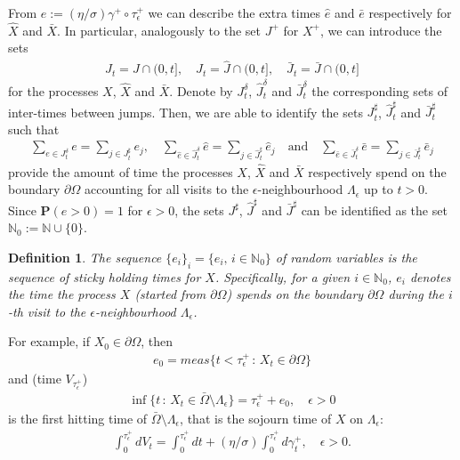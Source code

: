 \documentclass[11pt,a4paper]{article}
\newtheorem{definition}{Definition}
\newcommand{\magenta}{black}
\begin{document}
\noindent From $e:= (\eta/\sigma) \gamma^+ \circ \tau^+_\epsilon$ we can describe the extra times $\hat{e}$ and $\bar{e}$ respectively for $\hat{X}$ and $\bar{X}$. In particular, analogously to the set $J^+$ for $X^+$, we can introduce the sets
\begin{align*}
J_t = J \cap (0, t], \quad \hat{J}_t = \hat{J} \cap (0, t], \quad \bar{J}_t = \bar{J} \cap (0, t]
\end{align*}
for the processes $X$, $\hat{X}$ and $\bar{X}$. Denote by $J^\delta_t$, $\hat{J}^\delta_t$ and $\bar{J}^\delta_t$ the corresponding sets of inter-times between jumps. Then, we are able to identify the sets $J^\sharp_t$, $\hat{J}^\sharp_t$ and $\bar{J}^\sharp_t$ such that
\begin{align}
\sum_{ e \in J^\delta_t} e=\sum_{ j \in J^\sharp_t} e_j, \quad \sum_{\hat{e} \in \hat{J}^\delta_t} \hat{e} = \sum_{j \in \hat{J}^\sharp_t} \hat{e}_j \quad \textrm{and} \quad \sum_{\bar{e} \in \bar{J}^\delta_t} \bar{e} = \sum_{j \in \bar{J}^\sharp_t} \bar{e}_j
\label{totalAmount}
\end{align}
provide the amount of time the processes $X$, $\hat{X}$ and $\bar{X}$ respectively spend on the boundary $\partial \Omega$ accounting for all visits to the $\epsilon$-neighbourhood $\Lambda_\epsilon$ up to $t>0$. Since $\mathbf{P}(e >0) = 1$ for $\epsilon>0$, the sets $J^\sharp$, $\hat{J}^\sharp$ and $\bar{J}^\sharp$ can be identified as the set $\mathbb{N}_0 := \mathbb{N} \cup \{0\}$.

{\color{\magenta}
\begin{definition}
The sequence $\{e_i\}_i = \{e_i,\, i \in \mathbb{N}_0\}$ of random variables is the sequence of sticky holding times for $X$. Specifically, for a given $i \in \mathbb{N}_0$, $e_i$ denotes the time the process $X$ (started from $\partial \Omega$) spends on the boundary $\partial \Omega$ during the $i$-th visit to the $\epsilon$-neighbourhood $\Lambda_\epsilon$. 
\label{def:HTX}
\end{definition}
}

For example, if $X_0 \in \partial \Omega$, then 
\begin{align*}
e_0 = meas\{t < \tau^+_\epsilon\,:\, X_t \in \partial \Omega\}
\end{align*}
and (time $V_{\tau^+_\epsilon}$)
\begin{align*}
\inf\{t\,:\, X_t \in \bar{\Omega} \setminus \Lambda_\epsilon  \} = \tau^+_\epsilon + e_0, \quad \epsilon > 0
\end{align*} 
is the first hitting time of $\bar{\Omega} \setminus \Lambda_\epsilon$, that is the sojourn time of $X$ on $\Lambda_\epsilon$:
\begin{align}
\int_0^{\tau^+_\epsilon} dV_t = \int_0^{\tau^+_\epsilon} dt + (\eta/\sigma) \int_0^{\tau^+_\epsilon} d\gamma^+_t, \quad \epsilon>0.
\label{occLTe}
\end{align}
\end{document}
